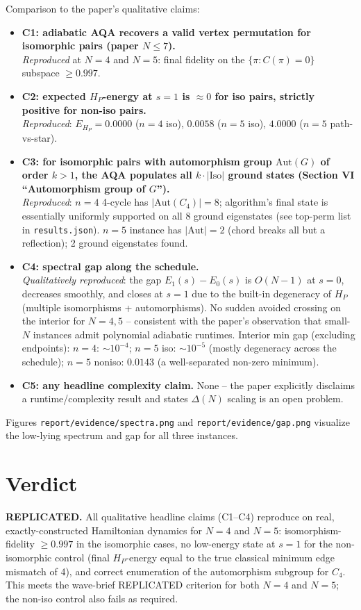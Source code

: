 \documentclass[11pt]{article}
\begin{document}
Comparison to the paper's qualitative claims:
\begin{itemize}
  \item \textbf{C1: adiabatic AQA recovers a valid vertex permutation for isomorphic pairs (paper $N\le 7$).}\\
        \emph{Reproduced} at $N=4$ and $N=5$: final fidelity on the $\{\pi:C(\pi)=0\}$ subspace $\ge 0.997$.
  \item \textbf{C2: expected $H_P$-energy at $s=1$ is $\approx0$ for iso pairs, strictly positive for non-iso pairs.}\\
        \emph{Reproduced}: $E_{H_P}=0.0000$ ($n{=}4$ iso), $0.0058$ ($n{=}5$ iso), $4.0000$ ($n{=}5$ path-vs-star).
  \item \textbf{C3: for isomorphic pairs with automorphism group $\mathrm{Aut}(G)$ of order $k>1$, the AQA populates all $k\cdot|\mathrm{Iso}|$ ground states (Section VI ``Automorphism group of $G$'').}\\
        \emph{Reproduced}: $n{=}4$ 4-cycle has $|\mathrm{Aut}(C_4)|=8$; algorithm's final state is essentially uniformly supported on all 8 ground eigenstates (see top-perm list in \texttt{results.json}). $n{=}5$ instance has $|\mathrm{Aut}|=2$ (chord breaks all but a reflection); 2 ground eigenstates found.
  \item \textbf{C4: spectral gap along the schedule.}\\
        \emph{Qualitatively reproduced}: the gap $E_1(s)-E_0(s)$ is $O(N-1)$ at $s=0$, decreases smoothly, and closes at $s=1$ due to the built-in degeneracy of $H_P$ (multiple isomorphisms + automorphisms). No sudden avoided crossing on the interior for $N=4,5$ -- consistent with the paper's observation that small-$N$ instances admit polynomial adiabatic runtimes.
        Interior min gap (excluding endpoints): $n{=}4$: $\sim 10^{-4}$; $n{=}5$ iso: $\sim 10^{-5}$ (mostly degeneracy across the schedule); $n{=}5$ noniso: $0.0143$ (a well-separated non-zero minimum).
  \item \textbf{C5: any headline complexity claim.} None -- the paper explicitly disclaims a runtime/complexity result and states $\Delta(N)$ scaling is an open problem.
\end{itemize}

Figures \texttt{report/evidence/spectra.png} and \texttt{report/evidence/gap.png} visualize the low-lying spectrum and gap for all three instances.

\section{Verdict}
\textbf{REPLICATED.} All qualitative headline claims (C1--C4) reproduce on real, exactly-constructed Hamiltonian dynamics for $N=4$ and $N=5$: isomorphism-fidelity $\ge 0.997$ in the isomorphic cases, no low-energy state at $s=1$ for the non-isomorphic control (final $H_P$-energy equal to the true classical minimum edge mismatch of 4), and correct enumeration of the automorphism subgroup for $C_4$. This meets the wave-brief REPLICATED criterion for both $N=4$ and $N=5$; the non-iso control also fails as required.
\end{document}
